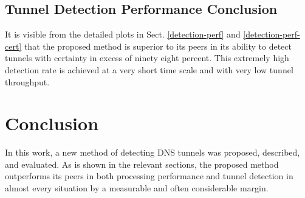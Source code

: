 \documentclass{llncs}
\begin{document}
\subsection{Tunnel Detection Performance Conclusion}
It is visible from the detailed plots in Sect. \ref{detection-perf} and
\ref{detection-perf-cert} that the proposed method is superior to its peers in
its ability to detect tunnels with certainty in excess of ninety eight percent.
This extremely high detection rate is achieved at a very short time scale and
with very low tunnel throughput.

\section{Conclusion}
\label{conclusion}

In this work, a new method of detecting DNS tunnels was proposed, described, and
evaluated.
As is shown in the relevant sections, the proposed method outperforms its peers
in both processing performance and tunnel detection in almost every situation by
a measurable and often considerable margin.
\end{document}

